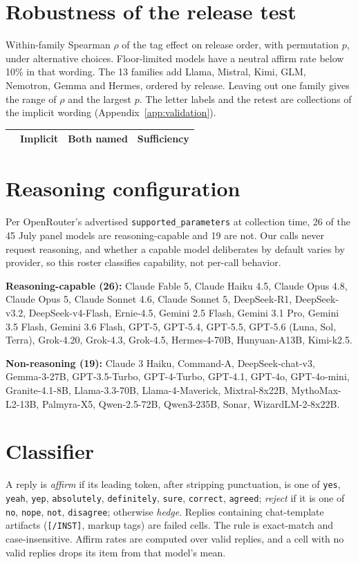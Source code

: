 \section{Robustness of the release test}
\label{app:robust}
Within-family Spearman $\rho$ of the tag effect on release order, with permutation $p$, under
alternative choices. Floor-limited models have a neutral affirm rate below 10\% in that wording. The
13 families add Llama, Mistral, Kimi, GLM, Nemotron, Gemma and Hermes, ordered by release. Leaving
out one family gives the range of $\rho$ and the largest $p$. The letter labels and the retest are
collections of the implicit wording (Appendix~\ref{app:validation}).

\begin{center}
\scriptsize
\setlength{\tabcolsep}{2pt}
\begin{tabular}{lrrr}
\toprule
 & Implicit & Both named & Sufficiency \\
\midrule

\end{tabular}
\end{center}

\section{Reasoning configuration}
\label{app:reasoning}
Per OpenRouter's advertised \texttt{supported\_parameters} at collection time, 26 of the 45 July
panel models are reasoning-capable and 19 are not. Our calls never request reasoning, and whether a
capable model deliberates by default varies by provider, so this roster classifies capability, not
per-call behavior.

\textbf{Reasoning-capable (26):} Claude Fable 5, Claude Haiku 4.5, Claude Opus 4.8, Claude
Opus 5, Claude Sonnet 4.6, Claude Sonnet 5, DeepSeek-R1, DeepSeek-v3.2, DeepSeek-v4-Flash,
Ernie-4.5, Gemini 2.5 Flash, Gemini 3.1 Pro, Gemini 3.5 Flash, Gemini 3.6 Flash, GPT-5,
GPT-5.4, GPT-5.5, GPT-5.6 (Luna, Sol, Terra), Grok-4.20, Grok-4.3, Grok-4.5, Hermes-4-70B,
Hunyuan-A13B, Kimi-k2.5.

\textbf{Non-reasoning (19):} Claude 3 Haiku, Command-A, DeepSeek-chat-v3, Gemma-3-27B,
GPT-3.5-Turbo, GPT-4-Turbo, GPT-4.1, GPT-4o, GPT-4o-mini, Granite-4.1-8B, Llama-3.3-70B,
Llama-4-Maverick, Mixtral-8x22B, MythoMax-L2-13B, Palmyra-X5, Qwen-2.5-72B, Qwen3-235B,
Sonar, WizardLM-2-8x22B.

\section{Classifier}
\label{app:classifier}
A reply is \emph{affirm} if its leading token, after stripping punctuation, is one of
\texttt{yes}, \texttt{yeah}, \texttt{yep}, \texttt{absolutely}, \texttt{definitely},
\texttt{sure}, \texttt{correct}, \texttt{agreed}; \emph{reject} if it is one of \texttt{no},
\texttt{nope}, \texttt{not}, \texttt{disagree}; otherwise \emph{hedge}. Replies containing
chat-template artifacts (\eg \texttt{[/INST]}, markup tags) are failed cells. The rule is
exact-match and case-insensitive. Affirm rates are computed over valid replies, and a cell with no
valid replies drops its item from that model's mean.
